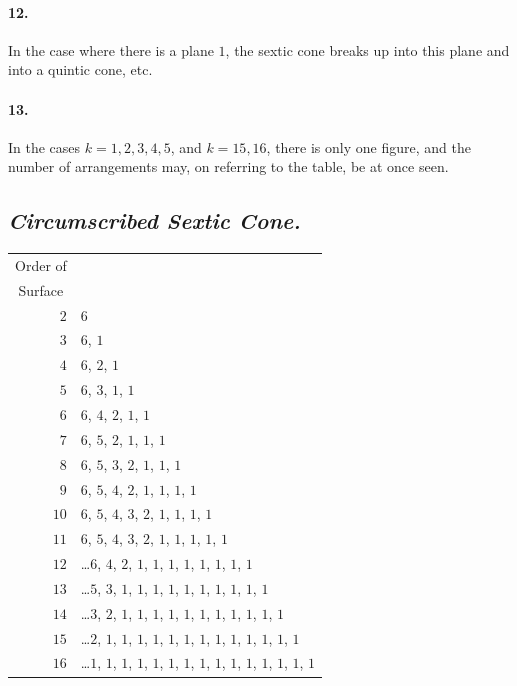 \documentclass[11pt,a4paper]{article}
\begin{document}
\paragraph{12.}
In the case where there is a plane $1$, the sextic cone breaks up into this plane and
into a quintic cone, etc.

\paragraph{13.}
In the cases $k = 1, 2, 3, 4, 5$, and $k = 15, 16$, there is only one figure, and the
number of arrangements may, on referring to the table, be at once seen.

\bigskip

\subsection*{\textit{Circumscribed Sextic Cone.}}

\begin{center}
\begin{tabular}{r|l}
\multicolumn{1}{c}{Order of}     & \\
\multicolumn{1}{c}{Surface}      & \\\hline
$2$  & $6$ \\
$3$  & $6$, $1$ \\
$4$  & $6$, $2$, $1$ \\
$5$  & $6$, $3$, $1$, $1$ \\
$6$  & $6$, $4$, $2$, $1$, $1$ \\
$7$  & $6$, $5$, $2$, $1$, $1$, $1$ \\
$8$  & $6$, $5$, $3$, $2$, $1$, $1$, $1$ \\
$9$  & $6$, $5$, $4$, $2$, $1$, $1$, $1$, $1$ \\
$10$ & $6$, $5$, $4$, $3$, $2$, $1$, $1$, $1$, $1$ \\
$11$ & $6$, $5$, $4$, $3$, $2$, $1$, $1$, $1$, $1$, $1$ \\
$12$ & \ldots\quad $6$, $4$, $2$, $1$, $1$, $1$, $1$, $1$, $1$, $1$, $1$ \\
$13$ & \ldots\quad $5$, $3$, $1$, $1$, $1$, $1$, $1$, $1$, $1$, $1$, $1$, $1$ \\
$14$ & \ldots\quad $3$, $2$, $1$, $1$, $1$, $1$, $1$, $1$, $1$, $1$, $1$, $1$, $1$ \\
$15$ & \ldots\quad $2$, $1$, $1$, $1$, $1$, $1$, $1$, $1$, $1$, $1$, $1$, $1$, $1$, $1$ \\
$16$ & \ldots\quad $1$, $1$, $1$, $1$, $1$, $1$, $1$, $1$, $1$, $1$, $1$, $1$, $1$, $1$, $1$ \\
\end{tabular}
\end{center}
\end{document}
